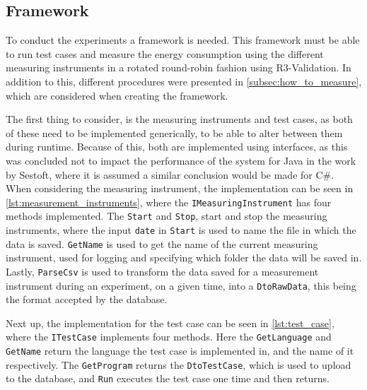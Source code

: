 \subsection{Framework}

To conduct the experiments a framework is needed. This framework must be able to run test cases and measure the energy consumption using the different measuring instruments in a rotated round-robin fashion using R3-Validation. In addition to this, different procedures were presented in \cref{subsec:how_to_measure}, which are considered when creating the framework.

The first thing to consider, is the measuring instruments and test cases, as both of these need to be implemented generically, to be able to alter between them during runtime. Because of this, both are implemented using interfaces, as this was concluded not to impact the performance of the system for Java in the work by Sestoft\cite[]{sestoft2013microbenchmarks}, where it is assumed a similar conclusion would be made for C\#. When considering the measuring instrument, the implementation can be seen in \cref{lst:measurement_instruments}, where the \texttt{IMeasuringInstrument} has four methods implemented. The \texttt{Start} and \texttt{Stop}, start and stop the measuring instruments, where the input \texttt{date} in \texttt{Start} is used to name the file in which the data is saved. \texttt{GetName} is used to get the name of the current measuring instrument, used for logging and specifying which folder the data will be saved in. Lastly, \texttt{ParseCsv} is used to transform the data saved for a measurement instrument during an experiment, on a given time, into a \texttt{DtoRawData}, this being the format accepted by the database.



Next up, the implementation for the test case can be seen in \cref{lst:test_case}, where the \texttt{ITestCase} implements four methods. Here the \texttt{GetLanguage} and \texttt{GetName} return the language the test case is implemented in, and the name of it respectively. The \texttt{GetProgram} returns the \texttt{DtoTestCase}, which is used to upload to the database, and \texttt{Run} executes the test case one time and then returns.



